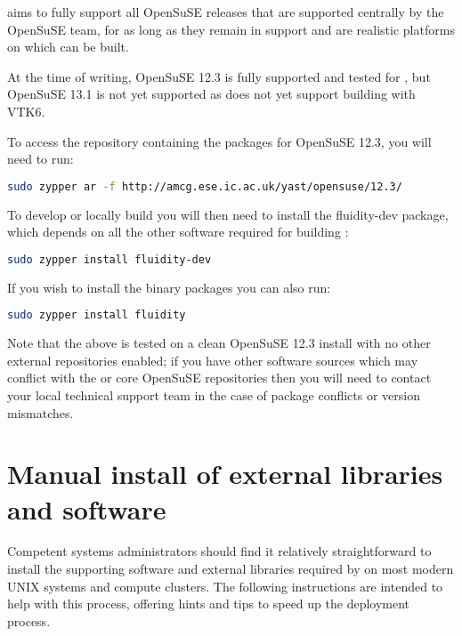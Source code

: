 \fluidity aims to fully support all OpenSuSE releases that are supported
centrally by the OpenSuSE team, for as long as they remain in support and are
realistic platforms on which \fluidity can be built.

At the time of writing, OpenSuSE 12.3 is fully supported and tested for \fluidity,
but OpenSuSE 13.1 is not yet supported as \fluidity does not yet support building
with VTK6.

To access the repository containing the \fluidity packages for OpenSuSE 12.3, you
will need to run:

\begin{lstlisting}[language=bash]
sudo zypper ar -f http://amcg.ese.ic.ac.uk/yast/opensuse/12.3/
\end{lstlisting}

To develop or locally build \fluidity you will then need to install the
fluidity-dev package, which depends on all the other software required for
building \fluidity:

\begin{lstlisting}[language=bash]
sudo zypper install fluidity-dev
\end{lstlisting}

If you wish to install the \fluidity binary packages you can also run:

\begin{lstlisting}[language=bash]
sudo zypper install fluidity
\end{lstlisting}

Note that the above is tested on a clean OpenSuSE 12.3 install with no other
external repositories enabled; if you have other software sources which may
conflict with the \fluidity or core OpenSuSE repositories then you will need to
contact your local technical support team in the case of package conflicts or
version mismatches.

\section{Manual install of external libraries and software}
\label{sec:required_libraries_manual_install}

Competent systems administrators should find it relatively straightforward to
install the supporting software and external libraries required by \fluidity on
most modern UNIX systems and compute clusters. The following instructions are
intended to help with this process, offering hints and tips to speed up the
deployment process.

